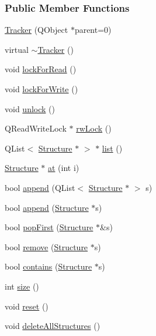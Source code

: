 \subsubsection*{Public Member Functions}
\begin{DoxyCompactItemize}
\item 
\hyperlink{classGlobalSearch_1_1Tracker_ae61188a8f66c57cc303a823da6130f25}{Tracker} (Q\+Object $\ast$parent=0)
\item 
virtual \hyperlink{classGlobalSearch_1_1Tracker_a231c0a58d7023188e0b9118924fac506}{$\sim$\+Tracker} ()
\item 
void \hyperlink{classGlobalSearch_1_1Tracker_afa0bbd85ec04527c7919a29746e235e4}{lock\+For\+Read} ()
\item 
void \hyperlink{classGlobalSearch_1_1Tracker_aba8064ec469694aa7207b734ac075fad}{lock\+For\+Write} ()
\item 
void \hyperlink{classGlobalSearch_1_1Tracker_a3c30e04b28dd39ddeff887d3bf4e812a}{unlock} ()
\item 
Q\+Read\+Write\+Lock $\ast$ \hyperlink{classGlobalSearch_1_1Tracker_a4aa19e3357f6803957c5646c4bb8f530}{rw\+Lock} ()
\item 
Q\+List$<$ \hyperlink{classGlobalSearch_1_1Structure}{Structure} $\ast$ $>$ $\ast$ \hyperlink{classGlobalSearch_1_1Tracker_a2d8fc282ef5d400a48f5afb931eeba8b}{list} ()
\item 
\hyperlink{classGlobalSearch_1_1Structure}{Structure} $\ast$ \hyperlink{classGlobalSearch_1_1Tracker_ab1457df5dea634a1f9b482cab0c8edb0}{at} (int i)
\item 
bool \hyperlink{classGlobalSearch_1_1Tracker_aebafa2ceea4e665f2660917eb18eb4b5}{append} (Q\+List$<$ \hyperlink{classGlobalSearch_1_1Structure}{Structure} $\ast$ $>$ s)
\item 
bool \hyperlink{classGlobalSearch_1_1Tracker_a1b1705061e58e92e1650e91cb44a07f6}{append} (\hyperlink{classGlobalSearch_1_1Structure}{Structure} $\ast$s)
\item 
bool \hyperlink{classGlobalSearch_1_1Tracker_a7e022f8bd6943c5eb0651f81ce369793}{pop\+First} (\hyperlink{classGlobalSearch_1_1Structure}{Structure} $\ast$\&s)
\item 
bool \hyperlink{classGlobalSearch_1_1Tracker_ad8a31bd3a5185e88157b3a61fdf48a27}{remove} (\hyperlink{classGlobalSearch_1_1Structure}{Structure} $\ast$s)
\item 
bool \hyperlink{classGlobalSearch_1_1Tracker_aa6feecde63a4483355a3672e1dd137dc}{contains} (\hyperlink{classGlobalSearch_1_1Structure}{Structure} $\ast$s)
\item 
int \hyperlink{classGlobalSearch_1_1Tracker_a3670df88ce17cde7984de8cf72ed189b}{size} ()
\item 
void \hyperlink{classGlobalSearch_1_1Tracker_a585a3720623c0df6f793e7b1b8fc586b}{reset} ()
\item 
void \hyperlink{classGlobalSearch_1_1Tracker_a29171b414ff3092c73113565e838bcc1}{delete\+All\+Structures} ()
\end{DoxyCompactItemize}


